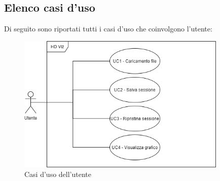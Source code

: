 \subsection{Elenco casi d'uso}
Di seguito sono riportati tutti i casi d'uso che coinvolgono l'utente:
\begin{figure}[h]
\includegraphics[width=10cm]{Section/Images/HDviz.png}
\centering
\caption{Casi d'uso dell'utente}
\end{figure}




